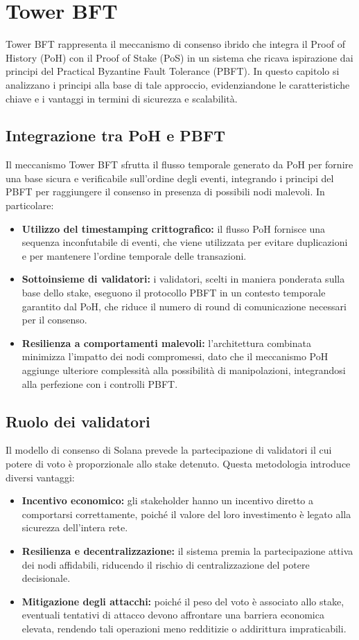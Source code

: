 \documentclass[a4paper,12pt]{report}
\begin{document}
	\section{Tower BFT}
	Tower BFT rappresenta il meccanismo di consenso ibrido che integra il Proof of History (PoH) con il Proof of Stake (PoS) in un sistema che ricava ispirazione dai principi del Practical Byzantine Fault Tolerance (PBFT). In questo capitolo si analizzano i principi alla base di tale approccio, evidenziandone le caratteristiche chiave e i vantaggi in termini di sicurezza e scalabilità.
	
	\subsection{Integrazione tra PoH e PBFT}
	Il meccanismo Tower BFT sfrutta il flusso temporale generato da PoH per fornire una base sicura e verificabile sull'ordine degli eventi, integrando i principi del PBFT per raggiungere il consenso in presenza di possibili nodi malevoli. In particolare:
	\begin{itemize}
		\item \textbf{Utilizzo del timestamping crittografico:} il flusso PoH fornisce una sequenza inconfutabile di eventi, che viene utilizzata per evitare duplicazioni e per mantenere l’ordine temporale delle transazioni.
		\item \textbf{Sottoinsieme di validatori:} i validatori, scelti in maniera ponderata sulla base dello stake, eseguono il protocollo PBFT in un contesto temporale garantito dal PoH, che riduce il numero di round di comunicazione necessari per il consenso.
		\item \textbf{Resilienza a comportamenti malevoli:} l’architettura combinata minimizza l’impatto dei nodi compromessi, dato che il meccanismo PoH aggiunge ulteriore complessità alla possibilità di manipolazioni, integrandosi alla perfezione con i controlli PBFT.
	\end{itemize}
	
	\subsection{Ruolo dei validatori}
	Il modello di consenso di Solana prevede la partecipazione di validatori il cui potere di voto è proporzionale allo stake detenuto. Questa metodologia introduce diversi vantaggi:
	\begin{itemize}
		\item \textbf{Incentivo economico:} gli stakeholder hanno un incentivo diretto a comportarsi correttamente, poiché il valore del loro investimento è legato alla sicurezza dell’intera rete.
		\item \textbf{Resilienza e decentralizzazione:} il sistema premia la partecipazione attiva dei nodi affidabili, riducendo il rischio di centralizzazione del potere decisionale.
		\item \textbf{Mitigazione degli attacchi:} poiché il peso del voto è associato allo stake, eventuali tentativi di attacco devono affrontare una barriera economica elevata, rendendo tali operazioni meno redditizie o addirittura impraticabili.
	\end{itemize}
	
\end{document}
